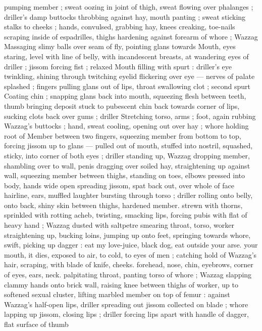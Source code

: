 pumping member ; sweat oozing in joint of thigh, sweat flowing over 
phalanges ; driller's damp buttocks throbbing against hay, mouth 
panting ; sweat sticking stalks to cheeks ; hands, convulsed, 
grabbing hay, knees creaking, toe-nails scraping inside of 
espadrilles, thighs hardening against forearm of whore ; Wazzag 
Massaging slimy balls over seam of fly, pointing glans towards 
Mouth, eyes staring, level with line of belly, with incandescent 
breasts, at wandering eyes of driller ; jissom forcing fist ; relaxed 
Mouth filling with spurt : driller's eye twinkling, shining through 
twitching eyelid flickering over eye --- nerves of palate splashed ; 
fingers pulling glans out of lips, throat swallowing clot ; second spurt 
Coating chin ; snapping glans back into mouth, squeezing flesh 
between teeth, thumb bringing deposit stuck to pubescent chin back 
towards corner of lips, sucking clots back over gums ; driller 
Stretching torso, arms ; foot, again rubbing Wazzag's buttocks ; 
hand, sweat cooling, opening out over hay ; whore holding root of 
Member between two fingers, squeezing member from bottom to top, 
forcing jissom up to glans --- pulled out of mouth, stuffed into 
nostril, squashed, sticky, into corner of both eyes ; driller standing 
up, Wazzag dropping member, shambling over to wall, penis dragging 
over soiled hay, straightening up against wall, squeezing member 
between thighs, standing on toes, elbows pressed into body, hands 
wide open spreading jissom, spat back out, over whole of face 
hairline, ears, muffled laughter bursting through torso ; driller rolling 
onto belly, onto back, shiny skin between thighs, hardened member. 
strewn with thorns, sprinkled with rotting acheb, twisting, smacking 
lips, forcing pubis with flat of heavy hand ; Wazzag dusted with 
saltpetre smearing throat, torso, worker straightening up, bucking 
loins, jumping up onto feet, springing towards whore, swift, picking 
up dagger : {\gl}{\thd} eat my love-juice, black dog, eat{\thd} outside your arse. 
your mouth, it dies, exposed to air, to cold, to eyes of men{\thd}{\gr} ; 
catching hold of Wazzag's hair, scraping, with blade of knife, cheeks. 
forehead, nose, chin, eyebrows, corner of eyes, ears, neck. 
palpitating throat, panting torso of whore ; Wazzag slapping clammy 
hands onto brick wall, raising knee between thighs of worker, up to 
softened sexual cluster, lifting marbled member on top of femur : 
against Wazzag's half-open lips, driller spreading out jissom 
collected on blade ; whore lapping up jissom, closing lips ; driller 
forcing lips apart with handle of dagger, flat surface of thumb 
